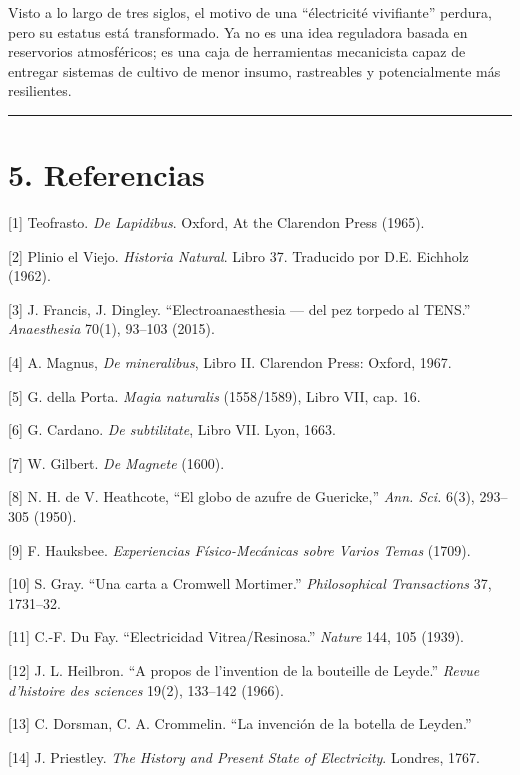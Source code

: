 \documentclass[
]{article}
\begin{document}
Visto a lo largo de tres siglos, el motivo de una ``électricité
vivifiante'' perdura, pero su estatus está transformado. Ya no es una
idea reguladora basada en reservorios atmosféricos; es una caja de
herramientas mecanicista capaz de entregar sistemas de cultivo de menor
insumo, rastreables y potencialmente más resilientes.

\begin{center}\rule{0.5\linewidth}{0.5pt}\end{center}

\section{5. Referencias}\label{referencias}

{[}1{]} Teofrasto. \emph{De Lapidibus}. Oxford, At the Clarendon Press
(1965).

{[}2{]} Plinio el Viejo. \emph{Historia Natural}. Libro 37. Traducido
por D.E. Eichholz (1962).

{[}3{]} J. Francis, J. Dingley. ``Electroanaesthesia --- del pez torpedo
al TENS.'' \emph{Anaesthesia} 70(1), 93--103 (2015).

{[}4{]} A. Magnus, \emph{De mineralibus}, Libro II. Clarendon Press:
Oxford, 1967.

{[}5{]} G. della Porta. \emph{Magia naturalis} (1558/1589), Libro VII,
cap. 16.

{[}6{]} G. Cardano. \emph{De subtilitate}, Libro VII. Lyon, 1663.

{[}7{]} W. Gilbert. \emph{De Magnete} (1600).

{[}8{]} N. H. de V. Heathcote, ``El globo de azufre de Guericke,''
\emph{Ann. Sci.} 6(3), 293--305 (1950).

{[}9{]} F. Hauksbee. \emph{Experiencias Físico-Mecánicas sobre Varios
Temas} (1709).

{[}10{]} S. Gray. ``Una carta a Cromwell Mortimer.'' \emph{Philosophical
Transactions} 37, 1731--32.

{[}11{]} C.-F. Du Fay. ``Electricidad Vitrea/Resinosa.'' \emph{Nature}
144, 105 (1939).

{[}12{]} J. L. Heilbron. ``A propos de l'invention de la bouteille de
Leyde.'' \emph{Revue d'histoire des sciences} 19(2), 133--142 (1966).

{[}13{]} C. Dorsman, C. A. Crommelin. ``La invención de la botella de
Leyden.''

{[}14{]} J. Priestley. \emph{The History and Present State of
Electricity}. Londres, 1767.
\end{document}
